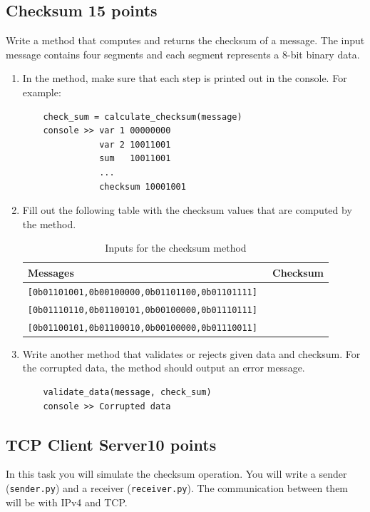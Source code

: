 \documentclass{resources/WeSTassignment}
\begin{document}
\subsection{Checksum \hfill{15 points} \label{checksum}}
Write a method that computes and returns the checksum of a message. The input message contains four segments and each segment represents a 8-bit binary data.
\begin{enumerate}
    \item In the method, make sure that each step is printed out in the console. For example:
    \begin{lstlisting}
    check_sum = calculate_checksum(message)
    console >> var 1 00000000
               var 2 10011001
               sum   10011001
               ...
               checksum 10001001
    \end{lstlisting}
    
    \item Fill out the following table with the checksum values that are computed by the method.
    \begin{table}[ht]
        \centering
        \begin{tabular}{ll}
             \textbf{Messages} & \textbf{Checksum} \\
             \hline
             \texttt{[0b01101001,0b00100000,0b01101100,0b01101111]} &  \\
             \texttt{[0b01110110,0b01100101,0b00100000,0b01110111]} &  \\
             \texttt{[0b01100101,0b01100010,0b00100000,0b01110011] } &  \\
        \end{tabular}
        \caption{Inputs for the checksum method}
        \label{tab:my_label}
    \end{table}
    
    \item Write another method that validates or rejects given data and checksum. For the corrupted data, the method should output an error message.
    
    \begin{lstlisting}
    validate_data(message, check_sum)
    console >> Corrupted data
    \end{lstlisting}
    
\end{enumerate}
\subsection{TCP Client Server\hfill{10 points}}
In this task you will simulate the checksum operation. You will write a sender (\texttt{sender.py}) and a receiver (\texttt{receiver.py}). The communication between them will be with IPv4 and TCP.  
\end{document}

